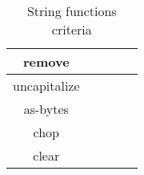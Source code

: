 \documentclass[anonymous,sigplan,review,11pt,nonacm,natbib=false]{acmart}
\begin{document}
\begin{table*}[]
\begin{tabular}{|c||c|c|c|c|}
            remove &  &  &  & \\ \hline

            uncapitalize &  &  &  & \\ \hline

            as-bytes &  &  &  & \\ \hline

            chop &  &  &  & \\ \hline

            clear &  &  &  & \\ \hline


        \end{tabular}
        \caption{String functions criteria}
        \label{tab:my_label}
    \end{table*}

    \printbibliography
\end{document}
